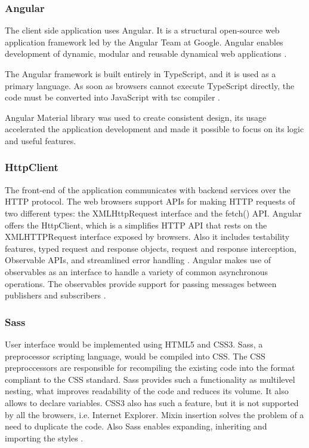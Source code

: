 \subsubsection{Angular}
The client side application uses Angular. It is a structural open-source web application framework led by the Angular Team at Google. Angular enables development of dynamic, modular and reusable dynamical web applications \cite{angular_getting_started}.

The Angular framework is built entirely in TypeScript, and it is used as a primary 
language. As soon as browsers cannot execute TypeScript directly, the code must be converted into JavaScript with tsc compiler \cite[TypeScript Configuration]{angular}.

Angular Material library was used to create consistent design, its usage accelerated the application development and made it possible to focus on its logic and useful features.

\subsubsection{HttpClient}
The front-end of the application communicates with backend services over the HTTP protocol. The web browsers support APIs for making HTTP requests of two different types: the XMLHttpRequest interface and the fetch() API. Angular offers the HttpClient, which is a simplifies HTTP API that rests on the XMLHTTPRequest interface exposed by browsers. Also it includes testability features, typed request and response objects, request and response interception, Observable APIs, and streamlined error handling \cite[HttpClient]{angular}. Angular makes use of observables as an interface to handle a variety of common asynchronous operations. The observables provide support for passing messages between publishers and subscribers \cite[Observables \& RxJS]{angular}. 

\subsubsection{Sass}
User interface would be implemented using HTML5 and CSS3. Sass, a preprocessor scripting language, would be compiled into CSS. The CSS preproccessors are responsible for recompiling the existing code into the format compliant to the CSS standard. Sass provides such a functionality as multilevel nesting, what improves readability of the code and reduces its volume. It also allows to declare variables. CSS3 also has such a feature, but it is not supported by all the browsers, i.e. Internet Explorer. Mixin insertion solves the problem of a need to duplicate the code. Also Sass enables expanding, inheriting and importing the styles \cite{sass}.

